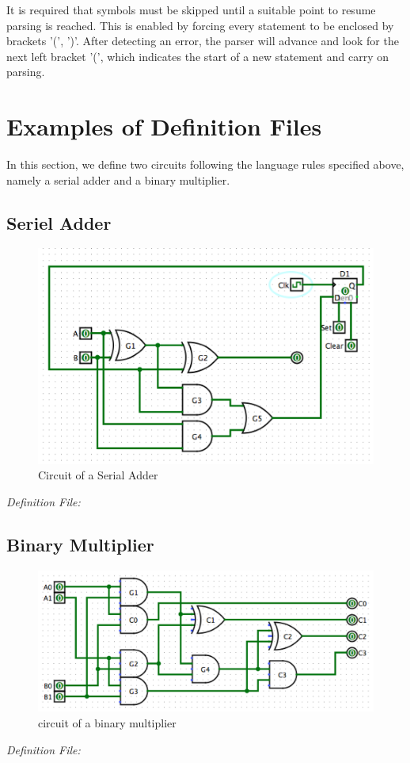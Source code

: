 \documentclass[12pt]{article}
\def\n{\noindent}
\begin{document}
\vspace{0.3cm}

\n It is required that symbols must be skipped until a suitable point to resume
parsing is reached. This is enabled by forcing every statement to be enclosed by
brackets '(', ')'. After detecting an error, the parser will advance and look
for the next left bracket '(', which indicates the start of a new statement and
carry on parsing.

\section{Examples of Definition Files}
In this section, we define two circuits following the language rules specified above, namely a serial adder and a binary multiplier.

\subsection{Seriel Adder}
\begin{figure}[H]
    \centering
    \includegraphics[scale=0.6]{sequential_carry_adder.png}
    \caption{Circuit of a Serial Adder}
\end{figure}

\emph{Definition File:}



\subsection{Binary Multiplier}
\begin{figure}[H]
    \centering
    \includegraphics[scale=0.6]{bin_multiplier.png}
    \caption{circuit of a binary multiplier}
\end{figure}
\emph{Definition File:}

\end{document}
